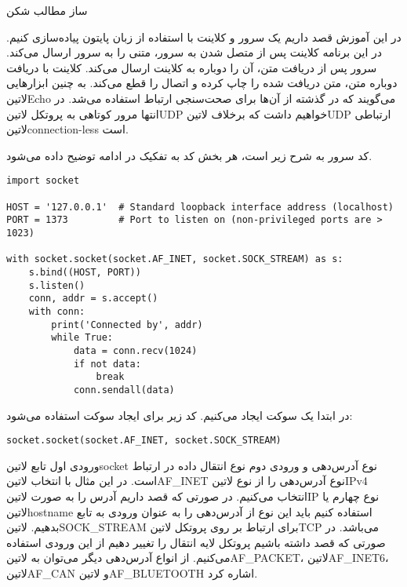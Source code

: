 \documentclass[]{article}
\begin{document}
  ‌ساز
  ‌مطالب
  ‌شکن

  در این آموزش قصد داریم یک سرور و کلاینت‌ با استفاده از زبان پایتون پیاده‌سازی کنیم.
  در این برنامه کلاینت‌ پس از متصل شدن به سرور، متنی را به سرور ارسال می‌کند.
  سرور پس از دریافت متن، آن را دوباره به کلاینت‌ ارسال می‌کند. کلاینت‌ با دریافت‌ دوباره متن، متن دریافت شده را چاپ کرده و اتصال را قطع می‌کند.
  به چنین ابزارهایی ‌لاتین{Echo} می‌گویند که در گذشته از آن‌ها برای صحت‌سنجی ارتباط استفاده می‌شد.
  در انتها مرور کوتاهی به پروتکل ‌لاتین{UDP} خواهیم داشت که برخلاف ‌لاتین{UDP} ارتباطی ‌لاتین{connection-less} است.


  کد سرور به شرح زیر است، هر بخش کد به تفکیک در ادامه توضیح داده می‌شود.

  \begin{latin}
  \begin{verbatim}
import socket

HOST = '127.0.0.1'  # Standard loopback interface address (localhost)
PORT = 1373         # Port to listen on (non-privileged ports are > 1023)

with socket.socket(socket.AF_INET, socket.SOCK_STREAM) as s:
    s.bind((HOST, PORT))
    s.listen()
    conn, addr = s.accept()
    with conn:
        print('Connected by', addr)
        while True:
            data = conn.recv(1024)
            if not data:
                break
            conn.sendall(data)
  \end{verbatim}
  \end{latin}

 در ابتدا یک سوکت‌ ایجاد می‌کنیم. کد زیر برای ایجاد سوکت‌ استفاده می‌شود:

  \begin{latin}
  \begin{verbatim}
socket.socket(socket.AF_INET, socket.SOCK_STREAM)
  \end{verbatim}
  \end{latin}

  ورودی اول تابع ‌لاتین{socket} نوع آدرس‌دهی و ورودی دوم نوع انتقال داده در ارتباط است‌.
  در این مثال با انتخاب ‌لاتین{AF\_INET} نوع آدرس‌دهی را از نوع ‌لاتین{IPv4} انتخاب می‌کنیم‌.
  در صورتی که قصد داریم آدرس را به صورت ‌لاتین{IP} نوع چهارم یا ‌لاتین{hostname} استفاده کنیم
  باید این نوع از آدرس‌دهی را به عنوان ورودی به تابع بدهیم‌.
  ‌لاتین{SOCK\_STREAM} برای ارتباط بر روی پروتکل ‌لاتین{TCP} می‌باشد.
  در صورتی که قصد داشته باشیم پروتکل لایه انتقال را تغییر دهیم از این ورودی استفاده می‌کنیم.
  از انواع آدرس‌دهی دیگر می‌توان به ‌لاتین{AF\_PACKET}، ‌لاتین{AF\_INET6}، ‌لاتین{AF\_CAN} و ‌لاتین{AF\_BLUETOOTH} اشاره کرد.
\end{document}
